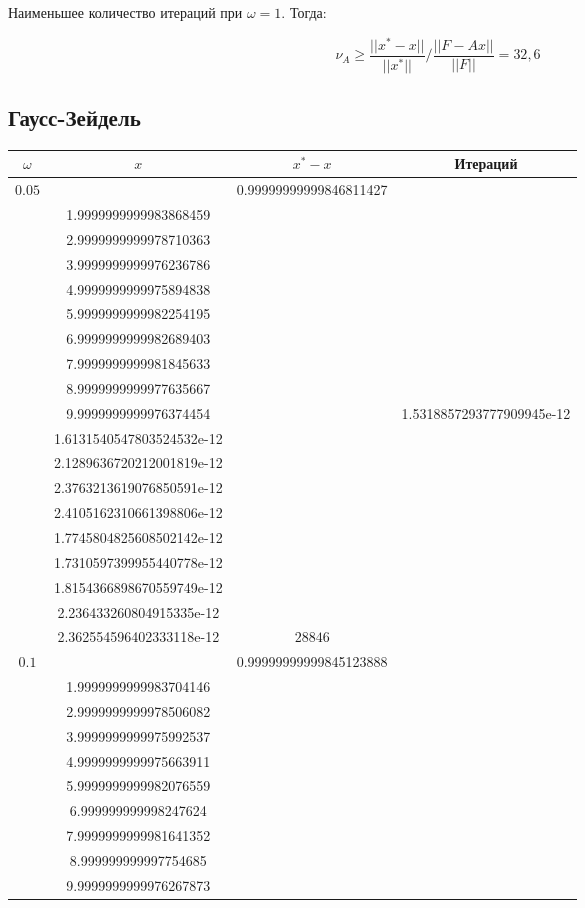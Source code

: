 \documentclass[oneside, final, 12pt]{extarticle}
\begin{document}
Наименьшее количество итераций при \(\omega = 1\). Тогда:

\[\nu_A \geqslant \frac{||x^*-x||}{||x^*||} / \frac{||F-Ax||}{||F||} = 32,6\]

\subsection{Гаусс-Зейдель}

\begin{longtable}{|c|c|c|c|} \hline
\(\omega\)&\(x\)&\(x^*-x\)&Итераций\\ \hline
\(0.05\) &
\(\begin{aligned} & 0.99999999999846811427 \\ & 1.9999999999983868459 \\ & 2.9999999999978710363 \\ & 3.9999999999976236786 \\ & 4.9999999999975894838 \\ & 5.9999999999982254195 \\ & 6.9999999999982689403 \\ & 7.9999999999981845633 \\ & 8.9999999999977635667 \\ & 9.9999999999976374454 \end{aligned}\) &
\(\begin{aligned} & 1.5318857293777909945e-12 \\ & 1.6131540547803524532e-12 \\ & 2.1289636720212001819e-12 \\ & 2.3763213619076850591e-12 \\ & 2.4105162310661398806e-12 \\ & 1.7745804825608502142e-12 \\ & 1.7310597399955440778e-12 \\ & 1.8154366898670559749e-12 \\ & 2.236433260804915335e-12 \\ & 2.362554596402333118e-12 \end{aligned}\) &
\(28846\) \\ \hline
\(0.1\) &
\(\begin{aligned} & 0.99999999999845123888 \\ & 1.9999999999983704146 \\ & 2.9999999999978506082 \\ & 3.9999999999975992537 \\ & 4.9999999999975663911 \\ & 5.9999999999982076559 \\ & 6.999999999998247624 \\ & 7.9999999999981641352 \\ & 8.999999999997754685 \\ & 9.9999999999976267873 \end{aligned}\) &

\end{longtable}
\end{document}
